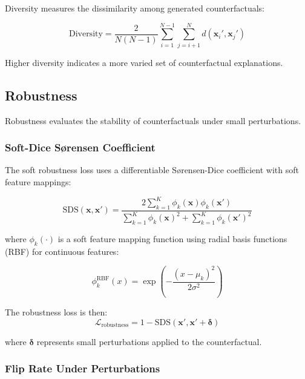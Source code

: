 \documentclass{article}
\begin{document}
Diversity measures the dissimilarity among generated counterfactuals:

\begin{equation}
\text{Diversity} = \frac{2}{N(N-1)} \sum_{i=1}^{N-1} \sum_{j=i+1}^{N} d(\mathbf{x}_i', \mathbf{x}_j')
\end{equation}

Higher diversity indicates a more varied set of counterfactual explanations.

\subsection{Robustness}
\label{subsec:robustness}

Robustness evaluates the stability of counterfactuals under small perturbations.

\subsubsection{Soft-Dice Sørensen Coefficient}
\label{subsubsec:soft-dice}

The soft robustness loss uses a differentiable Sørensen-Dice coefficient with soft feature mappings:

\begin{equation}
\text{SDS}(\mathbf{x}, \mathbf{x}') = \frac{2 \sum_{k=1}^{K} \phi_k(\mathbf{x}) \phi_k(\mathbf{x}')}{\sum_{k=1}^{K} \phi_k(\mathbf{x})^2 + \sum_{k=1}^{K} \phi_k(\mathbf{x}')^2}
\end{equation}

where $\phi_k(\cdot)$ is a soft feature mapping function using radial basis functions (RBF) for continuous features:

\begin{equation}
\phi_k^{\text{RBF}}(x) = \exp\left(-\frac{(x - \mu_k)^2}{2\sigma^2}\right)
\end{equation}

The robustness loss is then:
\begin{equation}
\mathcal{L}_{\text{robustness}} = 1 - \text{SDS}(\mathbf{x}', \mathbf{x}' + \boldsymbol{\delta})
\end{equation}

where $\boldsymbol{\delta}$ represents small perturbations applied to the counterfactual.

\subsubsection{Flip Rate Under Perturbations}
\label{subsubsec:flip-rate}
\end{document}
